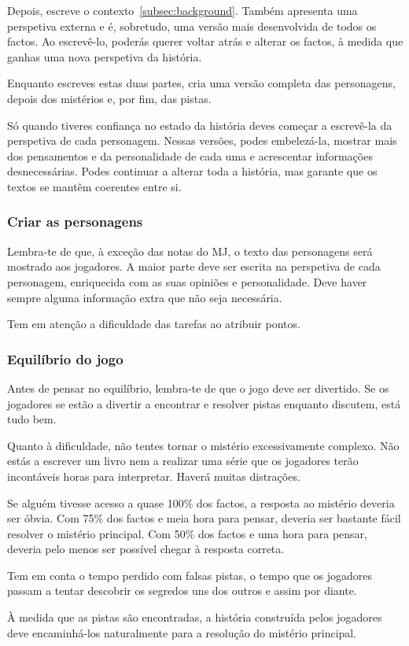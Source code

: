 Depois, escreve o contexto~\ref{subsec:background}. Também apresenta uma perspetiva externa e é, sobretudo, uma versão mais desenvolvida de todos os factos. Ao escrevê-lo, poderás querer voltar atrás e alterar os factos, à medida que ganhas uma nova perspetiva da história.

Enquanto escreves estas duas partes, cria uma versão completa das personagens, depois dos mistérios e, por fim, das pistas.

Só quando tiveres confiança no estado da história deves começar a escrevê-la da perspetiva de cada personagem. Nessas versões, podes embelezá-la, mostrar mais dos pensamentos e da personalidade de cada uma e acrescentar informações desnecessárias. Podes continuar a alterar toda a história, mas garante que os textos se mantêm coerentes entre si.

\subsubsection{Criar as personagens}
Lembra-te de que, à exceção das notas do MJ, o texto das personagens será mostrado aos jogadores. A maior parte deve ser escrita na perspetiva de cada personagem, enriquecida com as suas opiniões e personalidade. Deve haver sempre alguma informação extra que não seja necessária.

Tem em atenção a dificuldade das tarefas ao atribuir pontos.

\subsubsection{Equilíbrio do jogo}
Antes de pensar no equilíbrio, lembra-te de que o jogo deve ser divertido. Se os jogadores se estão a divertir a encontrar e resolver pistas enquanto discutem, está tudo bem.

Quanto à dificuldade, não tentes tornar o mistério excessivamente complexo. Não estás a escrever um livro nem a realizar uma série que os jogadores terão incontáveis horas para interpretar. Haverá muitas distrações.

Se alguém tivesse acesso a quase 100\% dos factos, a resposta ao mistério deveria ser óbvia. Com 75\% dos factos e meia hora para pensar, deveria ser bastante fácil resolver o mistério principal. Com 50\% dos factos e uma hora para pensar, deveria pelo menos ser possível chegar à resposta correta.

Tem em conta o tempo perdido com falsas pistas, o tempo que os jogadores passam a tentar descobrir os segredos uns dos outros e assim por diante.

À medida que as pistas são encontradas, a história construída pelos jogadores deve encaminhá-los naturalmente para a resolução do mistério principal.

